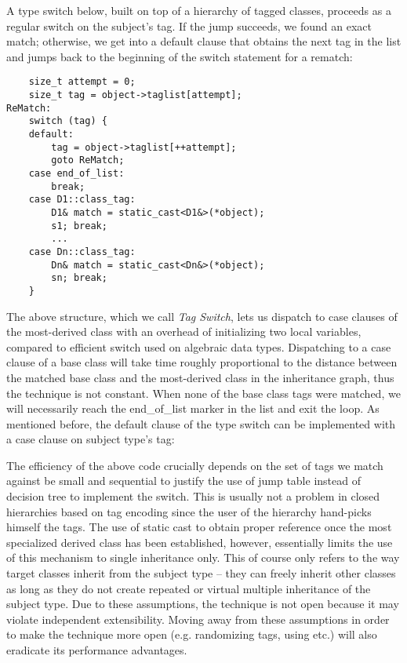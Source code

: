 A type switch below, built on top of a hierarchy of tagged classes, proceeds as 
a regular switch on the subject's tag. If the jump succeeds, we found an exact 
match; otherwise, we get into a default clause that obtains the next tag in the
list and jumps back to the beginning of the switch statement for a rematch:

\begin{lstlisting}
    size_t attempt = 0; 
    size_t tag = object->taglist[attempt];
ReMatch:
    switch (tag) {
    default:
        tag = object->taglist[++attempt];
        goto ReMatch;
    case end_of_list: 
        break;
    case D1::class_tag: 
        D1& match = static_cast<D1&>(*object); 
        s1; break;
        ...
    case Dn::class_tag: 
        Dn& match = static_cast<Dn&>(*object); 
        sn; break;
    }
\end{lstlisting}

\noindent
The above structure, which we call \emph{Tag Switch}, lets us dispatch to 
case clauses of the most-derived class with an overhead of initializing two 
local variables, compared to efficient switch used on algebraic data types. 
Dispatching to a case clause of a base class will take time roughly proportional 
to the distance between the matched base class and the most-derived class in the 
inheritance graph, thus the technique is not constant. When none of the base 
class tags were matched, we will necessarily reach the end\_of\_list marker in 
the list and exit the loop. As mentioned before, the default 
clause of the type switch can be implemented with a case clause on subject 
type's tag: 

The efficiency of the above code crucially depends on the set of tags we match 
against be small and sequential to justify the use of jump table instead of 
decision tree to implement the switch. This is usually not a problem in closed 
hierarchies based on tag encoding since the user of the hierarchy hand-picks 
himself the tags. The use of static cast to obtain proper reference once the most 
specialized derived class has been established, however, essentially limits the use of 
this mechanism to single inheritance only. This of course only refers to the way target 
classes inherit from the subject type -- they can freely inherit other classes 
as long as they do not create repeated or virtual multiple inheritance of the 
subject type. Due to these assumptions, the technique is not open because it may 
violate independent extensibility. Moving away from these assumptions in order 
to make the technique more open (e.g. randomizing tags, using 
 etc.) will also eradicate its performance advantages.